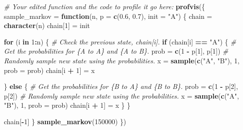 \documentclass[
]{article}
\newenvironment{Shaded}{\begin{snugshade}}{\end{snugshade}}
\newcommand{\CommentTok}[1]{\textcolor[rgb]{0.56,0.35,0.01}{\textit{#1}}}
\newcommand{\ControlFlowTok}[1]{\textcolor[rgb]{0.13,0.29,0.53}{\textbf{#1}}}
\newcommand{\DataTypeTok}[1]{\textcolor[rgb]{0.13,0.29,0.53}{#1}}
\newcommand{\DecValTok}[1]{\textcolor[rgb]{0.00,0.00,0.81}{#1}}
\newcommand{\FloatTok}[1]{\textcolor[rgb]{0.00,0.00,0.81}{#1}}
\newcommand{\KeywordTok}[1]{\textcolor[rgb]{0.13,0.29,0.53}{\textbf{#1}}}
\newcommand{\NormalTok}[1]{#1}
\newcommand{\OperatorTok}[1]{\textcolor[rgb]{0.81,0.36,0.00}{\textbf{#1}}}
\newcommand{\StringTok}[1]{\textcolor[rgb]{0.31,0.60,0.02}{#1}}
\begin{document}
\begin{Shaded}
\begin{Highlighting}[]
\CommentTok{\# Your edited function and the code to profile it go here:}
\KeywordTok{profvis}\NormalTok{(\{}
\NormalTok{  sample\_markov =}\StringTok{ }\ControlFlowTok{function}\NormalTok{(n, }\DataTypeTok{p =} \KeywordTok{c}\NormalTok{(}\FloatTok{0.6}\NormalTok{, }\FloatTok{0.7}\NormalTok{), }\DataTypeTok{init =} \StringTok{"A"}\NormalTok{) \{}
\NormalTok{  chain =}\StringTok{ }\KeywordTok{character}\NormalTok{(n)}
\NormalTok{  chain[}\DecValTok{1}\NormalTok{] =}\StringTok{ }\NormalTok{init}

  \ControlFlowTok{for}\NormalTok{ (i }\ControlFlowTok{in} \DecValTok{1}\OperatorTok{:}\NormalTok{n) \{}
    \CommentTok{\# Check the previous state, chain[i].}
    \ControlFlowTok{if}\NormalTok{ (chain[i] }\OperatorTok{==}\StringTok{ "A"}\NormalTok{) \{}
      \CommentTok{\# Get the probabilities for \{A to A\} and \{A to B\}.}
\NormalTok{      prob =}\StringTok{ }\KeywordTok{c}\NormalTok{(}\DecValTok{1} \OperatorTok{{-}}\StringTok{ }\NormalTok{p[}\DecValTok{1}\NormalTok{], p[}\DecValTok{1}\NormalTok{])}
      \CommentTok{\# Randomly sample new state using the probabilities.}
\NormalTok{      x =}\StringTok{ }\KeywordTok{sample}\NormalTok{(}\KeywordTok{c}\NormalTok{(}\StringTok{"A"}\NormalTok{, }\StringTok{"B"}\NormalTok{), }\DecValTok{1}\NormalTok{, }\DataTypeTok{prob =}\NormalTok{ prob)}
\NormalTok{      chain[i }\OperatorTok{+}\StringTok{ }\DecValTok{1}\NormalTok{] =}\StringTok{ }\NormalTok{x}

\NormalTok{    \} }\ControlFlowTok{else}\NormalTok{ \{}
      \CommentTok{\# Get the probabilities for \{B to A\} and \{B to B\}.}
\NormalTok{      prob =}\StringTok{ }\KeywordTok{c}\NormalTok{(}\DecValTok{1} \OperatorTok{{-}}\StringTok{ }\NormalTok{p[}\DecValTok{2}\NormalTok{], p[}\DecValTok{2}\NormalTok{])}
      \CommentTok{\# Randomly sample new state using the probabilities.}
\NormalTok{      x =}\StringTok{ }\KeywordTok{sample}\NormalTok{(}\KeywordTok{c}\NormalTok{(}\StringTok{"A"}\NormalTok{, }\StringTok{"B"}\NormalTok{), }\DecValTok{1}\NormalTok{, }\DataTypeTok{prob =}\NormalTok{ prob)}
\NormalTok{      chain[i }\OperatorTok{+}\StringTok{ }\DecValTok{1}\NormalTok{] =}\StringTok{ }\NormalTok{x}
\NormalTok{    \}}
\NormalTok{  \}}

\NormalTok{  chain[}\OperatorTok{{-}}\DecValTok{1}\NormalTok{]}
\NormalTok{\}}
  \KeywordTok{sample\_markov}\NormalTok{(}\DecValTok{150000}\NormalTok{)}
\NormalTok{\})}
\end{Highlighting}
\end{Shaded}
\end{document}

